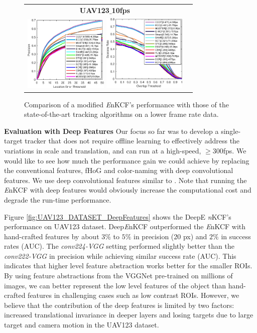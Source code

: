 \documentclass[10pt,twocolumn,letterpaper]{article}
\begin{document}
\begin{figure}[!h]
\centering
\begin{tabular}{cc}
\tiny\quad\textbf{UAV123$\_$10fps}\\
\includegraphics[width=4.02cm]{./figures/pr_uav123_10fps.eps}
\includegraphics[width=4.00cm]{./figures/sr_uav123_10fps.eps}\\
\end{tabular}
\caption{Comparison of a modified {\it E}nKCF's performance with those
  of the state-of-the-art tracking algorithms on a lower frame rate
  data.}
\label{fig:UAV123_10fpsDATASET}
\end{figure}

\textbf{Evaluation with Deep Features} Our focus so far was to develop
a single-target tracker that does not require offline learning to
effectively address the variations in scale and translation, and can
run at a high-speed, $\ge 300$fps. We would like to see how much the
performance gain we could achieve by replacing the conventional
features, fHoG and color-naming with deep convolutional features. We
use deep convolutional features similar to
\cite{danelljan2015convolutional,ma2015hierarchical}. Note that
running the {\it E}nKCF with deep features would obviously increase
the computational cost and degrade the run-time performance.

Figure \ref{fig:UAV123_DATASET_DeepFeatures} shows the DeepE{\it
  n}KCF's performance on UAV123 dataset. Deep{\it E}nKCF outperformed
the {\it E}nKCF with hand-crafted features by about $3\%$ to $5\%$ in
precision (20 px) and $2\%$ in success rates (AUC). The
\textit{conv224-VGG} setting performed slightly better than the
\textit{conv222-VGG} in precision while achieving similar success rate
(AUC). This indicates that higher level feature abstraction works
better for the smaller ROIs. By using feature abstractions from the
VGGNet pre-trained on millions of images, we can better represent the
low level features of the object than hand-crafted features in
challenging cases such as low contrast ROIs. However, we believe that
the contribution of the deep features is limited by two factors:
increased translational invariance in deeper layers and losing targets
due to large target and camera motion in the UAV123 dataset.
\end{document}
